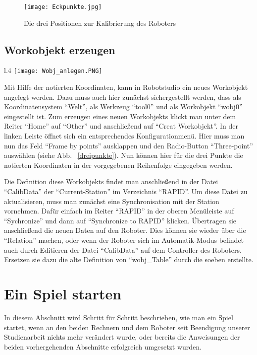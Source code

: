 \begin{figure}[htbp]
\centering
\texttt{[image: Eckpunkte.jpg]}
\caption{Die drei Positionen zur Kalibrierung des Roboters} 
\label{eckpunkte}
\end{figure}

\subsection{Workobjekt erzeugen}

\begin{wrapfigure}{l}{.4\textwidth}
\centering
\texttt{[image: Wobj\_anlegen.PNG]}
\vspace{-15pt}
\caption{Workobjekt über drei Punkte definieren} 
\label{dreipunkte}
\end{wrapfigure}

Mit Hilfe der notierten Koordinaten, kann in Robotstudio ein neues Workobjekt angelegt werden. Dazu muss auch hier zunächst sichergestellt werden, dass als Koordinatensystem \enquote{Welt}, als Werkzeug \enquote{tool0} und als Workobjekt \enquote{wobj0} eingestellt ist. Zum erzeugen eines neuen Workobjekts klickt man unter dem Reiter \enquote{Home} auf \enquote{Other} und anschließend auf \enquote{Creat Workobjekt}. In der linken Leiste öffnet sich ein entsprechendes Konfigurationmenü. Hier muss man nun das Feld \enquote{Frame by points} ausklappen und den Radio-Button \enquote{Three-point} auswählen (siehe Abb. ~\ref{dreipunkte}). Nun können hier für die drei Punkte die notierten Koordinaten  in der vorgegebenen Reihenfolge eingegeben werden.  

Die Definition diese Workobjekts findet man anschließend in der Datei \enquote{CalibData} der \enquote{Current-Station} im Verzeichnis \enquote{RAPID}. Um diese Datei zu aktualisieren, muss man zunächst eine Synchronisation mit der Station vornehmen. Dafür einfach im Reiter \enquote{RAPID} in der oberen Menüleiste auf \enquote{Sychronize} und dann auf \enquote{Synchronize to RAPID} klicken. 
Übertragen sie anschließend die neuen Daten auf den Roboter. Dies können sie wieder über die \enquote{Relation} machen, oder wenn der Roboter sich im Automatik-Modus befindet auch durch Editieren der Datei \enquote{CalibData} auf dem Controller des Roboters. 
Ersetzen sie dazu die alte Definition von \enquote{wobj\_Table} durch die soeben erstellte. 

\section{Ein Spiel starten}
\label{starten}
In diesem Abschnitt wird Schritt für Schritt beschrieben, wie man ein Spiel startet, wenn an den beiden Rechnern und dem Roboter seit Beendigung unserer Studienarbeit nichts mehr verändert wurde, oder bereits die Anweisungen der beiden vorhergehenden Abschnitte erfolgreich umgesetzt wurden.

